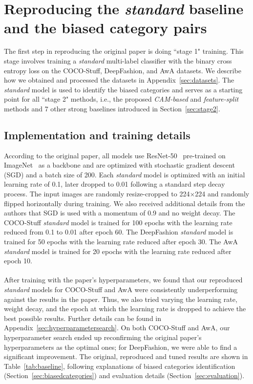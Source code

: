 
\section{Reproducing the \emph{standard} baseline and the biased category pairs} \label{sec:baseline}

The first step in reproducing the original paper is doing ``stage 1" training. This stage involves training a \emph{standard} multi-label classifier with the binary cross entropy loss on the COCO-Stuff, DeepFashion, and AwA datasets. We describe how we obtained and processed the datasets in Appendix~\ref{sec:datasets}. The \textit{standard} model is used to identify the biased categories and serves as a starting point for all ``stage 2" methods, i.e., the proposed \emph{CAM-based} and \emph{feature-split} methods and 7 other strong baselines introduced in Section~\ref{sec:stage2}.

\subsection{Implementation and training details} \label{sec:baselineimplementation}

According to the original paper, all models use ResNet-50~\cite{He2015} pre-trained on ImageNet~\cite{imagenet_cvpr09} as a backbone and are optimized with stochastic gradient descent (SGD) and a batch size of 200. Each \emph{standard} model is optimized with an initial learning rate of 0.1, later dropped to 0.01 following a standard step decay process. The input images are randomly resize-cropped to 224$\times$224 and randomly flipped horizontally during training. We also received additional details from the authors that SGD is used with a momentum of 0.9 and no weight decay. The COCO-Stuff \emph{standard} model is trained for 100 epochs with the learning rate reduced from 0.1 to 0.01 after epoch 60. The DeepFashion \emph{standard} model is trained for 50 epochs with the learning rate reduced after epoch 30. The AwA \emph{standard} model is trained for 20 epochs with the learning rate reduced after epoch 10.\\
\\
After training with the paper's hyperparameters, we found that our reproduced \textit{standard} models for COCO-Stuff and AwA were consistently underperforming against the results in the paper. Thus, we also tried varying the learning rate, weight decay, and the epoch at which the learning rate is dropped to achieve the best possible results. Further details can be found in Appendix~\ref{sec:hyperparametersearch}. On both COCO-Stuff and AwA, our hyperparameter search ended up reconfirming the original paper's hyperparameters as the optimal ones; for DeepFashion, we were able to find a significant improvement. The original, reproduced and tuned results are shown in Table~\ref{tab:baseline}, following explanations of biased categories identification (Section~\ref{sec:biasedcategories}) and evaluation details (Section~\ref{sec:evaluation}).


